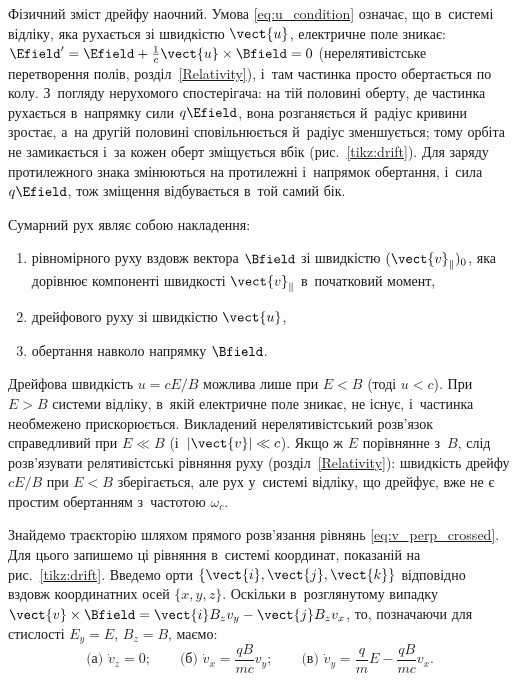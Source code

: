 Фізичний зміст дрейфу наочний. Умова \eqref{eq:u_condition} означає, що в~системі відліку, яка рухається зі швидкістю $\vect{u}$,
електричне поле зникає: $\Efield' = \Efield + \frac{1}{c}\vect{u}\times\Bfield = 0$ (нерелятивістське перетворення полів, розділ~\ref{Relativity}),
і~там частинка просто обертається по колу. З~погляду нерухомого спостерігача: на тій половині оберту, де частинка рухається в~напрямку
сили $q\Efield$, вона розганяється й~радіус кривини зростає, а~на другій половині сповільнюється й~радіус зменшується; тому орбіта не
замикається і~за кожен оберт зміщується вбік (рис.~\ref{tikz:drift}). Для заряду протилежного знака змінюються на протилежні і~напрямок
обертання, і~сила $q\Efield$, тож зміщення відбувається в~той самий бік.

Сумарний рух являє собою накладення:
\begin{enumerate}
	\item рівномірного руху вздовж вектора $\Bfield$ зі швидкістю $(\vect{v}_{\parallel})_0$, яка дорівнює компоненті швидкості $\vect{v}_{\parallel}$ в~початковий момент,
	\item дрейфового руху зі швидкістю $\vect{u}$,
	\item обертання навколо напрямку $\Bfield$.
\end{enumerate}

Дрейфова швидкість $u = cE/B$ можлива лише при $E < B$ (тоді $u < c$). При $E > B$ системи відліку, в~якій електричне поле зникає, не існує, і~частинка необмежено прискорюється. Викладений нерелятивістський розв'язок справедливий при $E \ll B$ (і~$|\vect{v}| \ll c$). Якщо ж $E$ порівнянне з~$B$, слід розв'язувати релятивістські рівняння руху (розділ~\ref{Relativity}): швидкість дрейфу $cE/B$ при $E<B$ зберігається, але рух у~системі відліку, що дрейфує, вже не є простим обертанням з~частотою $\omega_c$.

Знайдемо траєкторію шляхом прямого розв'язання рівнянь \eqref{eq:v_perp_crossed}. Для цього запишемо ці рівняння в~системі координат, показаній на рис.~\ref{tikz:drift}. Введемо орти $\{\vect{i}, \vect{j}, \vect{k}\}$ відповідно вздовж координатних осей $\{x, y, z\}$. Оскільки в~розглянутому випадку $\vect{v} \times \Bfield = \vect{i}B_z v_y - \vect{j}B_z v_x$, то, позначаючи для стислості $E_y = E$, $B_z = B$, маємо:
\begin{equation}\label{eq:system_components}
	\text{(а) } \dot{v}_z = 0; \qquad
	\text{(б) } \dot{v}_x = \frac{qB}{mc}v_y; \qquad
	\text{(в) } \dot{v}_y = \frac{q}{m}E - \frac{qB}{mc}v_x.
\end{equation}

